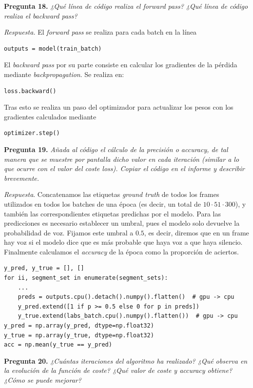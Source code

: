\documentclass[11pt]{article}
\begin{document}
\textbf{Pregunta 18.} \textit{¿Qué línea de código realiza el forward pass? ¿Qué línea de código realiza el backward pass?}

\textit{Respuesta.} El \textit{forward pass} se realiza para cada batch en la línea
\begin{verbatim}
outputs = model(train_batch)
\end{verbatim}

El \textit{backward pass} por su parte consiste en calcular los gradientes de la pérdida mediante \textit{backpropagation}. Se realiza en:
\begin{verbatim}
loss.backward()
\end{verbatim}

Tras esto se realiza un paso del optimizador para actualizar los pesos con los gradientes calculados mediante
\begin{verbatim}
optimizer.step()
\end{verbatim}

\textbf{Pregunta 19.} \textit{Añada al código el cálculo de la precisión o accuracy, de tal manera que se muestre por pantalla dicho valor en cada iteración (similar a lo que ocurre con el valor del coste loss). Copiar el código en el informe y describir brevemente.}

\textit{Respuesta}. Concatenamos las etiquetas \textit{ground truth} de todos los frames utilizados en todos los batches de una época (es decir, un total de $10\cdot 51 \cdot 300$), y también las correspondientes etiquetas predichas por el modelo. Para las predicciones es necesario establecer un umbral, pues el modelo solo devuelve la probabilidad de voz. Fijamos este umbral a $0.5$, es decir, diremos que en un frame hay voz si el modelo dice que es más probable que haya voz a que haya silencio. Finalmente calculamos el \textit{accuracy} de la época como la proporción de aciertos.

\begin{verbatim}
y_pred, y_true = [], []
for ii, segment_set in enumerate(segment_sets):
    ...
    preds = outputs.cpu().detach().numpy().flatten()  # gpu -> cpu
    y_pred.extend([1 if p >= 0.5 else 0 for p in preds])
    y_true.extend(labs_batch.cpu().numpy().flatten())  # gpu -> cpu
y_pred = np.array(y_pred, dtype=np.float32)
y_true = np.array(y_true, dtype=np.float32)
acc = np.mean(y_true == y_pred)
\end{verbatim}

\textbf{Pregunta 20.} \textit{¿Cuántas iteraciones del algoritmo ha realizado? ¿Qué observa en la evolución de la función de coste? ¿Qué valor de coste y accuracy obtiene? ¿Cómo se puede mejorar?}
\end{document}
